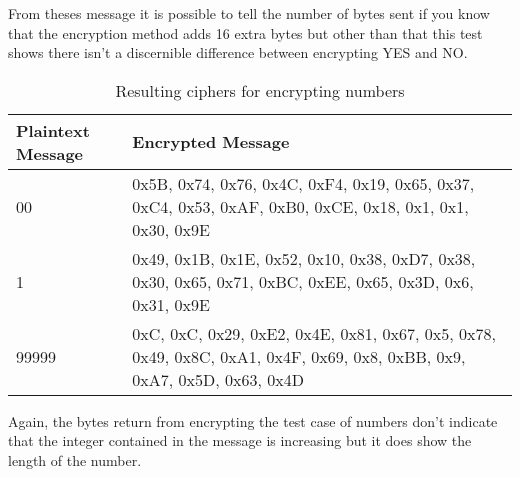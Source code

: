 From theses message it is possible to tell the number of bytes sent if you know that the encryption method adds 16 extra bytes but other than that this test shows there isn't a discernible difference between encrypting YES and NO.

\begin{table}[H]
	\centering
	\begin{tabular}{ | l | p{7cm} | }
	\hline
	Plaintext Message & Encrypted Message \\ \hline
	00 & 0x5B, 0x74, 0x76, 0x4C, 0xF4, 0x19, 0x65, 0x37, 0xC4, 0x53, 0xAF, 0xB0, 0xCE, 0x18, 0x1, 0x1, 0x30, 0x9E \\ \hline
	1 & 0x49, 0x1B, 0x1E, 0x52, 0x10, 0x38, 0xD7, 0x38, 0x30, 0x65, 0x71, 0xBC, 0xEE, 0x65, 0x3D, 0x6, 0x31, 0x9E\\ \hline
	99999 & 0xC, 0xC, 0x29, 0xE2, 0x4E, 0x81, 0x67, 0x5, 0x78, 0x49, 0x8C, 0xA1, 0x4F, 0x69, 0x8, 0xBB, 0x9, 0xA7, 0x5D, 0x63, 0x4D \\ \hline
	\end{tabular}
	\caption{Resulting ciphers for encrypting numbers}
	\label{tab:9999}
\end{table}

Again, the bytes return from encrypting the test case of numbers don't indicate that the integer contained in the message is increasing but it does show the length of the number.


